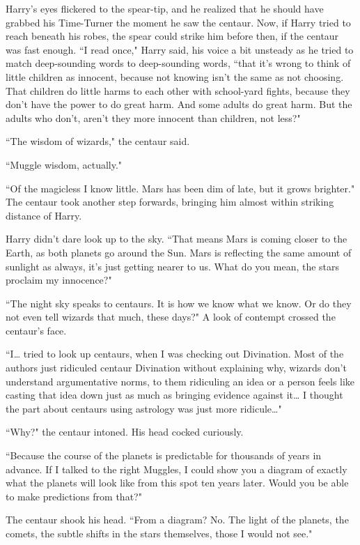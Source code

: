 Harry's eyes flickered to the spear-tip, and he realized that he should have grabbed his Time-Turner the moment he saw the centaur. Now, if Harry tried to reach beneath his robes, the spear could strike him before then, if the centaur was fast enough. ``I read once," Harry said, his voice a bit unsteady as he tried to match deep-sounding words to deep-sounding words, ``that it's wrong to think of little children as innocent, because not knowing isn't the same as not choosing. That children do little harms to each other with school-yard fights, because they don't have the power to do great harm. And some adults do great harm. But the adults who don't, aren't they more innocent than children, not less?"

``The wisdom of wizards," the centaur said.

``Muggle wisdom, actually."

``Of the magicless I know little. Mars has been dim of late, but it grows brighter." The centaur took another step forwards, bringing him almost within striking distance of Harry.

Harry didn't dare look up to the sky. ``That means Mars is coming closer to the Earth, as both planets go around the Sun. Mars is reflecting the same amount of sunlight as always, it's just getting nearer to us. What do you mean, the stars proclaim my innocence?"

``The night sky speaks to centaurs. It is how we know what we know. Or do they not even tell wizards that much, these days?" A look of contempt crossed the centaur's face.

``I{\ldots} tried to look up centaurs, when I was checking out Divination. Most of the authors just ridiculed centaur Divination without explaining why, wizards don't understand argumentative norms, to them ridiculing an idea or a person feels like casting that idea down just as much as bringing evidence against it{\ldots} I thought the part about centaurs using astrology was just more ridicule{\ldots}"

``Why?" the centaur intoned. His head cocked curiously.

``Because the course of the planets is predictable for thousands of years in advance. If I talked to the right Muggles, I could show you a diagram of exactly what the planets will look like from this spot ten years later. Would you be able to make predictions from that?"

The centaur shook his head. ``From a diagram? No. The light of the planets, the comets, the subtle shifts in the stars themselves, those I would not see."

